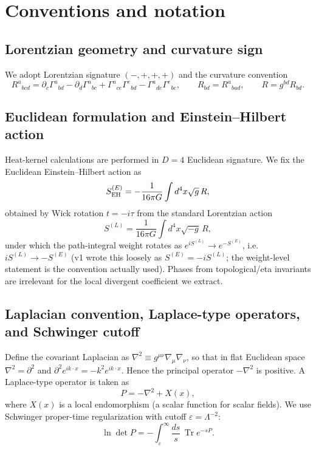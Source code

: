 \documentclass[11pt]{article}
\newcommand{\Tr}{\operatorname{Tr}}
\begin{document}
\section{Conventions and notation}

\subsection{Lorentzian geometry and curvature sign}
We adopt Lorentzian signature $(-,+,+,+)$ and the curvature convention
\[
R^a{}_{bcd} = \partial_c \Gamma^a{}_{bd} - \partial_d \Gamma^a{}_{bc}
+ \Gamma^a{}_{ce}\Gamma^e{}_{bd} - \Gamma^a{}_{de}\Gamma^e{}_{bc},
\qquad
R_{bd} = R^a{}_{bad},
\qquad
R = g^{bd} R_{bd}.
\]

\subsection{Euclidean formulation and Einstein--Hilbert action}
Heat-kernel calculations are performed in $D=4$ Euclidean signature. We fix
the Euclidean Einstein--Hilbert action as
\begin{equation}
S^{(E)}_{\rm EH} = -\frac{1}{16\pi G} \int d^4x \sqrt{g}\, R,
\label{eq:SEH}
\end{equation}
obtained by Wick rotation $t = -i\tau$ from the standard Lorentzian action
\[
S^{(L)} = \frac{1}{16\pi G} \int d^4x \sqrt{-g}\, R,
\]
under which the path-integral weight rotates as $e^{iS^{(L)}} \to
e^{-S^{(E)}}$, i.e.\ $iS^{(L)} \to -S^{(E)}$ (v1 wrote this loosely as
$S^{(E)} = -iS^{(L)}$; the weight-level statement is the convention actually
used). Phases from topological/eta invariants are irrelevant for the local
divergent coefficient we extract.

\subsection{Laplacian convention, Laplace-type operators, and Schwinger cutoff}
Define the covariant Laplacian as $\nabla^2 \equiv g^{\mu\nu}\nabla_\mu
\nabla_\nu$, so that in flat Euclidean space $\nabla^2 = \partial^2$ and
$\partial^2 e^{ik\cdot x} = -k^2 e^{ik\cdot x}$. Hence the principal operator
$-\nabla^2$ is positive. A Laplace-type operator is taken as
\[
P = -\nabla^2 + X(x),
\]
where $X(x)$ is a local endomorphism (a scalar function for scalar fields).
We use Schwinger proper-time regularization with cutoff
$\varepsilon = \Lambda^{-2}$:
\begin{equation}
\ln\det P = -\int_\varepsilon^\infty \frac{ds}{s}\, \Tr e^{-sP}.
\label{eq:schwinger}
\end{equation}
\end{document}
